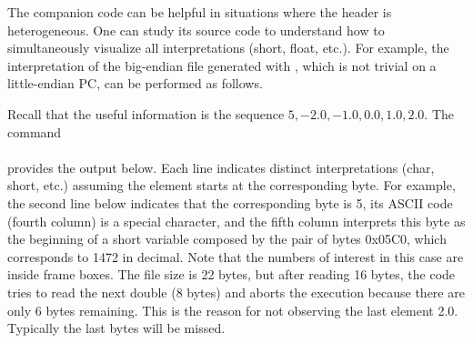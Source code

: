 The companion code  can be helpful in situations where the header is heterogeneous. One can study its source code to understand how to simultaneously visualize all interpretations (short, float, etc.).
%
For example, the interpretation of the big-endian file  generated with , which is not trivial on a little-endian PC, can be performed as follows.

Recall that the useful information is the sequence $5,-2.0,-1.0,0.0,1.0,2.0$. The command\\
\\
provides the output below. Each line indicates distinct interpretations (char, short, etc.) assuming the element starts at the corresponding byte. For example, the second line below indicates that the corresponding byte is 5, its ASCII code (fourth column) is a special character, and the fifth column interprets this byte as the beginning of a short variable composed by the pair of bytes 0x05C0, which corresponds to 1472 in decimal. Note that the numbers of interest in this case are inside frame boxes. The file size is 22 bytes, but after reading 16 bytes, the code tries to read the next double (8 bytes) and aborts the execution because there are only 6 bytes remaining. This is the reason for not observing the last element 2.0. Typically the last bytes will be missed.

